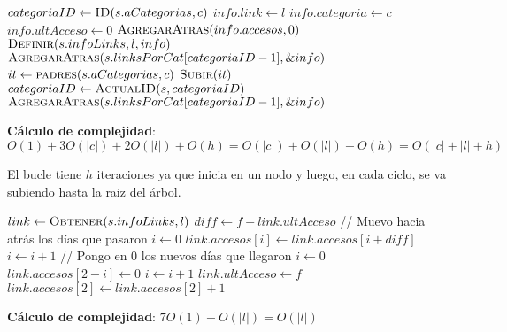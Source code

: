 \documentclass[10pt, a4paper]{article}
\let\TipoVariable=\texttt
\let\ModificadorArgumento=\textbf
\newcommand{\tab}{\hspace*{7mm}}
\newcommand{\In}[2]{\ModificadorArgumento{in} \ensuremath{#1}\,: \TipoVariable{#2}\xspace}
\newcommand{\Inout}[2]{\ModificadorArgumento{in/out} \ensuremath{#1}\,: \TipoVariable{#2}\xspace}
\begin{document}
\begin{algorithm}[H]
\caption*{iAgregarLink(\Inout{s}{LinkLinkIt}, \In{l}{link}, \In{c}{categoria})}
\begin{algorithmic}[1]
	\State $categoriaID \gets \Call{ID}{s.aCategorias, c}$
	\Statex
	\State $info.link \gets l$
	\State $info.categoria \gets c$
    \State $info.ultAcceso \gets 0$
        \State $\Call{AgregarAtras}{info.accesos, 0}$
    \EndFor
	\State $\Call{Definir}{s.infoLinks, l, info}$
    \State $\Call{AgregarAtras}{s.linksPorCat[categoriaID-1], \&info}$
	\Statex
	\State $it \gets \Call{padres}{s.aCategorias, c}$
    	\State $\Call{Subir}{it}$
    	\State $categoriaID \gets \Call{ActualID}{s, categoriaID}$
		\State $\Call{AgregarAtras}{s.linksPorCat[categoriaID-1], \&info}$
	\EndWhile
\end{algorithmic}
\textbf{C\'alculo de complejidad}: $O(1) + 3O(|c|) + 2O(|l|) + O(h) = O(|c|) + O(|l|) + O(h) = O(|c| + |l| + h)$
\par \tab El bucle tiene $h$ iteraciones ya que inicia en un nodo y luego, en cada ciclo, se va subiendo hasta la raiz del \'arbol.
\end{algorithm}

\begin{algorithm}[H]
\caption*{iAccederLink(\Inout{s}{LinkLinkIt}, \In{l}{link}, \In{f}{fecha})}
\begin{algorithmic}[1]
	\State $link \gets \Call{Obtener}{s.infoLinks, l}$
    \State $diff \gets f - link.ultAcceso$
    \Statex
    \Statex // Muevo hacia atr\'as los d\'ias que pasaron
    \State $i \gets 0$
        \State $link.accesos[i] \gets link.accesos[i + diff]$
        \State $i \gets i + 1$
    \EndWhile
    \Statex
    \Statex // Pongo en 0 los nuevos d\'ias que llegaron
    \State $i \gets 0$
        \State $link.accesos[2 - i] \gets 0$
        \State $i \gets i + 1$
    \EndWhile
    \Statex
    \State $link.ultAcceso \gets f$
    \State $link.accesos[2] \gets link.accesos[2] + 1$
\end{algorithmic}
\textbf{C\'alculo de complejidad}: $7O(1) + O(|l|) = O(|l|)$
\end{algorithm}
\end{document}
